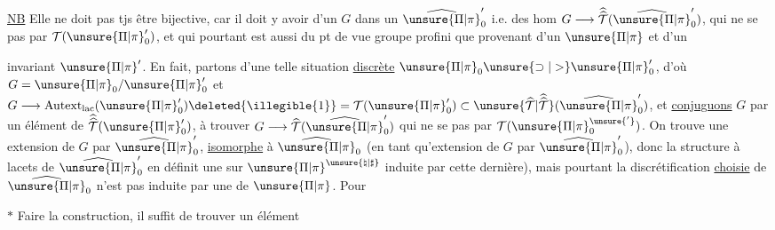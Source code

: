 \uline{NB} Elle ne doit pas tjs être bijective,
car il doit y avoir    d'un
\(G\) dans un \(\widehat{\unsure{\Pi|\pi}}'_0\) i.e. des hom
\(G\longrightarrow\widehat{\widehat{\mathcal T}}(\widehat{\unsure{\Pi|\pi}}'_0)\), qui ne se  pas
par \(\mathcal T(\unsure{\Pi|\pi}'_0)\), et qui pourtant est aussi
 du pt de vue groupe profini que
 provenant d'un \(\unsure{\Pi|\pi}\) et d'un 


invariant $\unsure{\Pi|\pi}'$. En fait, partons d'une telle situation \uline{discrète} $\unsure{\Pi|\pi}_0 \unsure{\supset|>} \unsure{\Pi|\pi}'_0$, d'où $G=\unsure{\Pi|\pi}_0/\unsure{\Pi|\pi}'_0$ et $G\longrightarrow \operatorname{Autext}_{\mathrm{lac}}(\unsure{\Pi|\pi}'_0)\deleted{\illegible{1}}=\mathcal T(\unsure{\Pi|\pi}'_0)\subset\unsure{\widehat{\mathcal T}|\widehat{\widehat{\mathcal T}}}(\widehat{\unsure{\Pi|\pi}}'_0)$, et \uline{conjuguons} $G$ par un élément \inserted{$\gamma$} de $\widehat{\widehat{\mathcal T}}(\unsure{\Pi|\pi}'_0)$,  à trouver $G\longrightarrow\widehat{\mathcal T}(\widehat{\unsure{\Pi|\pi}}'_0)$ qui ne se  pas par $\mathcal T(\unsure{\Pi|\pi}^{\unsure{'}}_0)$. On trouve une extension \inserted{$\unsure{\widehat{\unsure{\Pi|\pi}}|\unsure{\Pi|\pi}}^{\unsure{\natural|\sharp}}$} de $G$ par $\widehat{\unsure{\Pi|\pi}}'_0$, \uline{isomorphe} à $\widehat{\unsure{\Pi|\pi}}_0$ (en tant qu'extension de $G$ par $\widehat{\unsure{\Pi|\pi}}'_0$), donc la structure à lacets de $\widehat{\unsure{\Pi|\pi}}'_0$ en définit une sur $\unsure{\Pi|\pi}^{\unsure{\natural|\sharp}}$   induite par cette dernière), mais pourtant la discrétification \uline{choisie}  de $\widehat{\unsure{\Pi|\pi}}_0$ n'est pas induite par une de $\unsure{\Pi|\pi}$. Pour

$\ast$ Faire la construction, il suffit de trouver un élément  

